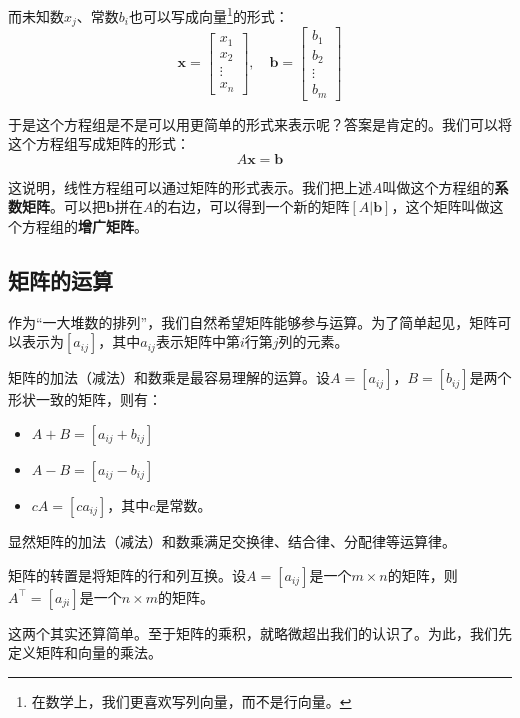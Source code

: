 而未知数$x_j$、常数$b_i$也可以写成向量\footnote{在数学上，我们更喜欢写列向量，而不是行向量。}的形式：
\begin{equation}
    \mathbf{x} =
    \begin{bmatrix}
        x_1 \\
        x_2 \\
        \vdots \\
        x_n
    \end{bmatrix}, \quad
    \mathbf{b} =
    \begin{bmatrix}
        b_1 \\
        b_2 \\
        \vdots \\
        b_m
    \end{bmatrix}
\end{equation}

于是这个方程组是不是可以用更简单的形式来表示呢？答案是肯定的。我们可以将这个方程组写成矩阵的形式：
\begin{equation}\label{eq:matrix_form}
    A \mathbf{x} = \mathbf{b}
\end{equation}

这说明，线性方程组可以通过矩阵的形式表示。我们把上述$A$叫做这个方程组的\textbf{系数矩阵}。可以把$\mathbf{b}$拼在$A$的右边，可以得到一个新的矩阵$[A | \mathbf{b}]$，这个矩阵叫做这个方程组的\textbf{增广矩阵}。

\subsection{矩阵的运算}

作为“一大堆数的排列”，我们自然希望矩阵能够参与运算。为了简单起见，矩阵可以表示为$[a_{ij}]$，其中$a_{ij}$表示矩阵中第$i$行第$j$列的元素。

矩阵的加法（减法）和数乘是最容易理解的运算。设$A = [a_{ij}]$，$B = [b_{ij}]$是两个形状一致的矩阵，则有：
\begin{itemize}
    \item $A + B = [a_{ij} + b_{ij}]$
    \item $A - B = [a_{ij} - b_{ij}]$
    \item $c A = [c a_{ij}]$，其中$c$是常数。
\end{itemize}
显然矩阵的加法（减法）和数乘满足交换律、结合律、分配律等运算律。

矩阵的转置是将矩阵的行和列互换。设$A = [a_{ij}]$是一个$m \times n$的矩阵，则$A^\top = [a_{ji}]$是一个$n \times m$的矩阵。

这两个其实还算简单。至于矩阵的乘积，就略微超出我们的认识了。为此，我们先定义矩阵和向量的乘法。

